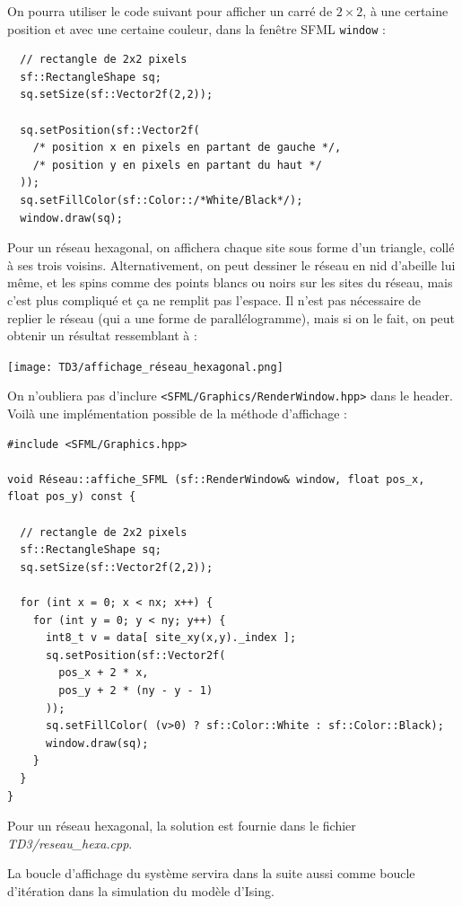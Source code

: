 \documentclass{book}
\newcommand{\inline}[1]{\texttt{#1}}
\def\filename{\emph}
\begin{document}
On pourra utiliser le code suivant pour afficher un carré de $2 \times 2$, à une certaine position et avec une certaine couleur, dans la fenêtre SFML \inline{window} :
\begin{verbatim}
  // rectangle de 2x2 pixels
  sf::RectangleShape sq;
  sq.setSize(sf::Vector2f(2,2));

  sq.setPosition(sf::Vector2f(
    /* position x en pixels en partant de gauche */,
    /* position y en pixels en partant du haut */
  ));
  sq.setFillColor(sf::Color::/*White/Black*/);
  window.draw(sq);
\end{verbatim}

Pour un réseau hexagonal, on affichera chaque site sous forme d'un triangle, collé à ses trois voisins. Alternativement, on peut dessiner le réseau en nid d'abeille lui même, et les spins comme des points blancs ou noirs sur les sites du réseau, mais c'est plus compliqué et ça ne remplit pas l'espace. Il n'est pas nécessaire de replier le réseau (qui a une forme de parallélogramme), mais si on le fait, on peut obtenir un résultat ressemblant à :
\begin{center}
\texttt{[image: TD3/affichage\_réseau\_hexagonal.png]}
\end{center}

\begin{correction}
On n'oubliera pas d'inclure \inline{<SFML/Graphics/RenderWindow.hpp>} dans le header. Voilà une implémentation possible de la méthode d'affichage :
\begin{verbatim}
#include <SFML/Graphics.hpp>

void Réseau::affiche_SFML (sf::RenderWindow& window, float pos_x, float pos_y) const {

  // rectangle de 2x2 pixels
  sf::RectangleShape sq;
  sq.setSize(sf::Vector2f(2,2));

  for (int x = 0; x < nx; x++) {
    for (int y = 0; y < ny; y++) {
      int8_t v = data[ site_xy(x,y)._index ];
      sq.setPosition(sf::Vector2f(
        pos_x + 2 * x,
        pos_y + 2 * (ny - y - 1)
      ));
      sq.setFillColor( (v>0) ? sf::Color::White : sf::Color::Black);
      window.draw(sq);
    }
  }
}
\end{verbatim}

Pour un réseau hexagonal, la solution est fournie dans le fichier \filename{TD3/reseau\_hexa.cpp}.
\end{correction}

La boucle d'affichage du système servira dans la suite aussi comme boucle d'itération dans la simulation du modèle d'Ising.
\end{document}
